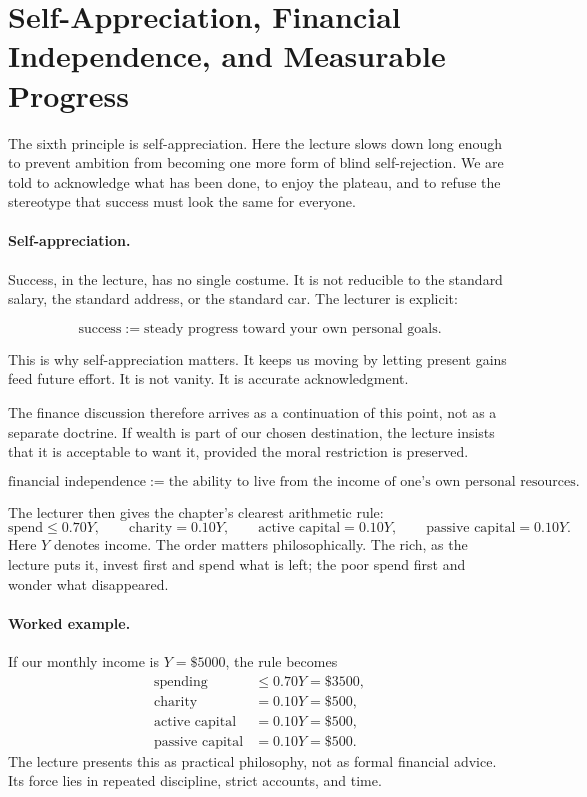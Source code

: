 \section{Self-Appreciation, Financial Independence, and Measurable Progress}

The sixth principle is self-appreciation. Here the lecture slows down long enough to prevent ambition from becoming one more form of blind self-rejection. We are told to acknowledge what has been done, to enjoy the plateau, and to refuse the stereotype that success must look the same for everyone.

\paragraph{Self-appreciation.}
Success, in the lecture, has no single costume. It is not reducible to the standard salary, the standard address, or the standard car. The lecturer is explicit:
\begin{definition}
\[
\text{success} := \text{steady progress toward your own personal goals}.
\]
\end{definition}
This is why self-appreciation matters. It keeps us moving by letting present gains feed future effort. It is not vanity. It is accurate acknowledgment.

The finance discussion therefore arrives as a continuation of this point, not as a separate doctrine. If wealth is part of our chosen destination, the lecture insists that it is acceptable to want it, provided the moral restriction is preserved.

\begin{definition}
\[
\text{financial independence} := \text{the ability to live from the income of one's own personal resources}.
\]
\end{definition}

The lecturer then gives the chapter's clearest arithmetic rule:
\begin{equation}
\text{spend} \le 0.70Y,\qquad
\text{charity}=0.10Y,\qquad
\text{active capital}=0.10Y,\qquad
\text{passive capital}=0.10Y.
\end{equation}
Here \(Y\) denotes income. The order matters philosophically. The rich, as the lecture puts it, invest first and spend what is left; the poor spend first and wonder what disappeared.

\paragraph{Worked example.}
If our monthly income is \(Y=\$5000\), the rule becomes
\begin{align}
\text{spending} &\le 0.70Y = \$3500,\\
\text{charity} &= 0.10Y = \$500,\\
\text{active capital} &= 0.10Y = \$500,\\
\text{passive capital} &= 0.10Y = \$500.
\end{align}
The lecture presents this as practical philosophy, not as formal financial advice. Its force lies in repeated discipline, strict accounts, and time.


